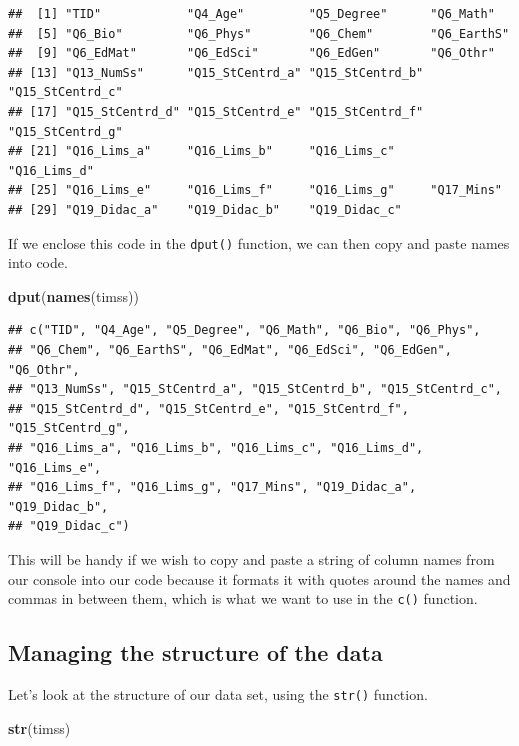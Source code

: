 \documentclass[
]{article}
\newenvironment{Shaded}{\begin{snugshade}}{\end{snugshade}}
\newcommand{\KeywordTok}[1]{\textcolor[rgb]{0.13,0.29,0.53}{\textbf{#1}}}
\newcommand{\NormalTok}[1]{#1}
\begin{document}
\begin{verbatim}
##  [1] "TID"            "Q4_Age"         "Q5_Degree"      "Q6_Math"       
##  [5] "Q6_Bio"         "Q6_Phys"        "Q6_Chem"        "Q6_EarthS"     
##  [9] "Q6_EdMat"       "Q6_EdSci"       "Q6_EdGen"       "Q6_Othr"       
## [13] "Q13_NumSs"      "Q15_StCentrd_a" "Q15_StCentrd_b" "Q15_StCentrd_c"
## [17] "Q15_StCentrd_d" "Q15_StCentrd_e" "Q15_StCentrd_f" "Q15_StCentrd_g"
## [21] "Q16_Lims_a"     "Q16_Lims_b"     "Q16_Lims_c"     "Q16_Lims_d"    
## [25] "Q16_Lims_e"     "Q16_Lims_f"     "Q16_Lims_g"     "Q17_Mins"      
## [29] "Q19_Didac_a"    "Q19_Didac_b"    "Q19_Didac_c"
\end{verbatim}

If we enclose this code in the \texttt{dput()} function, we can then copy and paste names into code.

\begin{Shaded}
\begin{Highlighting}[]
\KeywordTok{dput}\NormalTok{(}\KeywordTok{names}\NormalTok{(timss)) }
\end{Highlighting}
\end{Shaded}

\begin{verbatim}
## c("TID", "Q4_Age", "Q5_Degree", "Q6_Math", "Q6_Bio", "Q6_Phys", 
## "Q6_Chem", "Q6_EarthS", "Q6_EdMat", "Q6_EdSci", "Q6_EdGen", "Q6_Othr", 
## "Q13_NumSs", "Q15_StCentrd_a", "Q15_StCentrd_b", "Q15_StCentrd_c", 
## "Q15_StCentrd_d", "Q15_StCentrd_e", "Q15_StCentrd_f", "Q15_StCentrd_g", 
## "Q16_Lims_a", "Q16_Lims_b", "Q16_Lims_c", "Q16_Lims_d", "Q16_Lims_e", 
## "Q16_Lims_f", "Q16_Lims_g", "Q17_Mins", "Q19_Didac_a", "Q19_Didac_b", 
## "Q19_Didac_c")
\end{verbatim}

This will be handy if we wish to copy and paste a string of column names from our console into our code because it formats it with quotes around the names and commas in between them, which is what we want to use in the \texttt{c()} function.

\hypertarget{managing-the-structure-of-the-data}{%
\subsection{Managing the structure of the data}\label{managing-the-structure-of-the-data}}

Let's look at the structure of our data set, using the \texttt{str()} function.

\begin{Shaded}
\begin{Highlighting}[]
\KeywordTok{str}\NormalTok{(timss)}
\end{Highlighting}
\end{Shaded}
\end{document}
